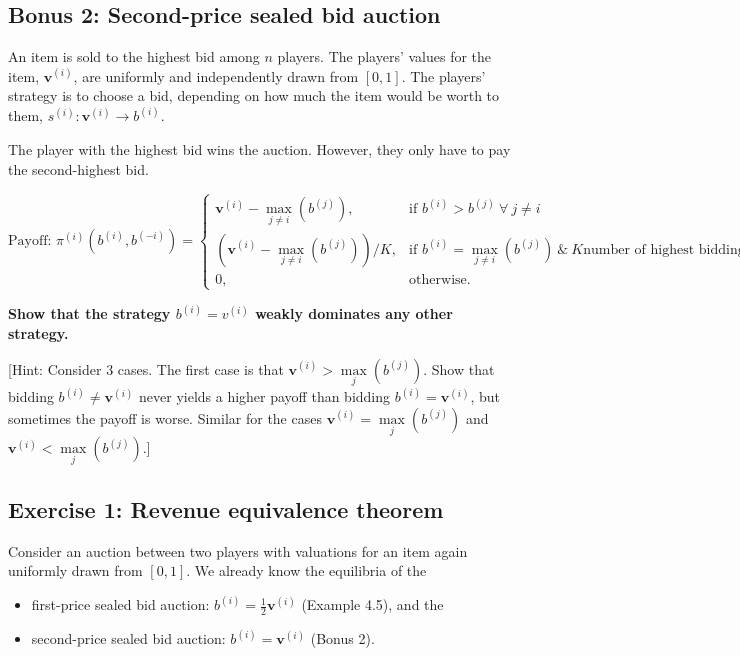 \documentclass[10pt]{article}
\begin{document}
\subsection*{Bonus 2: Second-price sealed bid auction}

An item is sold to the highest bid among \(n\) players. The players' values for
the item, \(\mathbf{v}^{(i)}\), are uniformly and independently drawn from \([0, 1]\).
The players' strategy is to choose a bid, depending on how much the item would be
worth to them, \(s^{(i)}: \mathbf{v}^{(i)} \rightarrow b^{(i)}\).

The player with the highest bid wins the auction. However, they only have to
pay the second-highest bid.

\begin{equation*}
\text{Payoff: }    \pi^{(i)} (b^{(i)}, b^{(-i)}) = 
    \begin{cases}
        \mathbf{v}^{(i)} - \max\limits_{j \neq i}(b^{(j)}), & \text{if } b^{(i)} > b^{(j)} \ \forall \ j \neq i \\
        (\mathbf{v}^{(i)} - \max\limits_{j \neq i}(b^{(j)})) / K, & \text{if } b^{(i)} = \max\limits_{j \neq i} (b^{(j)}) \ \& \ K \text{number of highest biddings}\\
        0,              & \text{otherwise}.
    \end{cases}
\end{equation*}

\textbf{Show that the strategy \(b^{(i)} = v^{(i)}\) weakly dominates any other
strategy.}

[Hint: Consider 3 cases. The first case is that \(\textbf{v}^{(i)} > \max\limits_j (b^{(j)})\).
Show that bidding \(b^{(i)} \neq \textbf{v}^{(i)}\) never yields a higher payoff than bidding
\(b^{(i)} = \textbf{v}^{(i)}\), but sometimes the payoff is worse. Similar for the cases
\(\textbf{v}^{(i)} = \max\limits_j (b^{(j)})\) and \(\textbf{v}^{(i)} < \max\limits_j (b^{(j)})\).]


\subsection*{Exercise 1: Revenue equivalence theorem}

Consider an auction between two players with valuations for an item again uniformly
drawn from \([0, 1]\). We already know the equilibria of the


\begin{itemize}
    \item first-price sealed bid auction: \(b ^ {(i)} =  \frac{1}{2} \textbf{v}^{(i)}\) (Example 4.5), and the
    \item second-price sealed bid auction: \(b ^ {(i)} =  \textbf{v}^{(i)}\) (Bonus 2).
\end{itemize}
\end{document}
